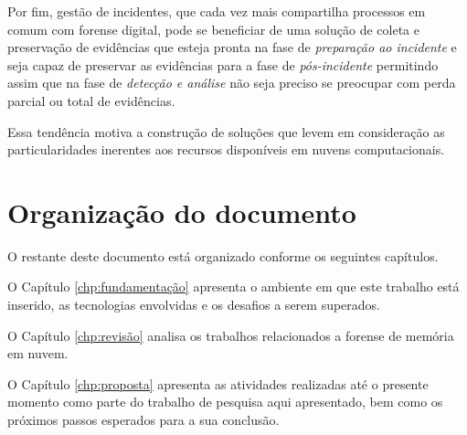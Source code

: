 Por fim, gestão de incidentes, que cada vez mais compartilha processos em comum com forense digital, pode se beneficiar de uma solução de coleta e preservação de evidências que esteja pronta na fase de \textit{preparação ao incidente} e seja capaz de preservar as evidências para a fase de \textit{pós-incidente} permitindo assim que na fase de \textit{detecção e análise} não seja preciso se preocupar com perda parcial ou total de evidências.


Essa tendência motiva a construção de soluções que levem em consideração as particularidades inerentes aos recursos disponíveis em nuvens computacionais.


\section{Organização do documento}
\label{sec:intro-organizacao}

O restante deste documento está organizado conforme os seguintes capítulos.

O Capítulo \ref{chp:fundamentação} apresenta o ambiente em que este trabalho está inserido, as tecnologias envolvidas e os desafios a serem superados. 

O Capítulo \ref{chp:revisão} analisa os trabalhos relacionados a forense de memória em nuvem. 

O Capítulo \ref{chp:proposta} apresenta as atividades realizadas até o presente momento como parte do trabalho de pesquisa aqui apresentado, bem como os próximos passos esperados para a sua conclusão.